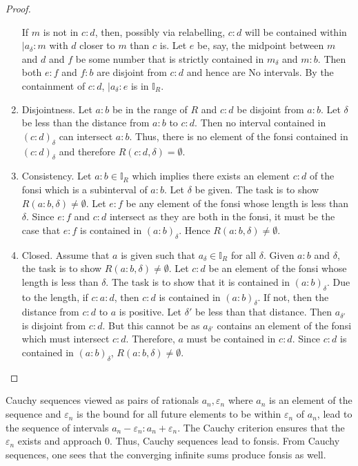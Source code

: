 \documentclass[12pt]{article}
\begin{document}
\begin{proof}
\begin{enumerate}
        If $m$ is not in $c:d$, then, possibly via relabelling, $c:d$ will be contained within $|a_\delta:m$ with $d$ closer to $m$ than $c$ is. Let $e$ be, say, the midpoint between $m$ and $d$ and $f$ be some number that is strictly contained in $m_\delta$ and $m:b$. Then both $e:f$ and $f:b$ are disjoint from $c:d$ and hence are No intervals. By the containment of $c:d$, $|a_\delta:e$ is in $\mathbb{I}_R$.
        \item Disjointness. Let $a:b$ be in the range of $R$ and $c:d$ be disjoint from $a:b$. Let $\delta$ be less than the distance from $a:b$ to $c:d$. Then no interval contained in $(c:d)_\delta$ can intersect $a:b$. Thus, there is no element of the fonsi contained in $(c:d)_\delta$ and therefore $R(c:d, \delta) = \emptyset$.
        \item Consistency. Let $a:b \in \mathbb{I}_R$ which implies there exists an element $c:d$ of the fonsi which is a subinterval of $a:b$. Let  $ \delta$ be given. The task is to show $R(a:b, \delta) \neq \emptyset$. Let $e:f$ be any element of the fonsi whose length is less than $\delta$. Since $e:f$ and $c:d$ intersect as they are both in the fonsi, it must be the case that $e:f$ is contained in $(a:b)_\delta$. Hence $R(a:b, \delta) \neq \emptyset$.
        \item Closed. Assume that $a$ is given such that $a_\delta \in \mathbb{I}_R$ for all $\delta$. Given $a:b$ and $\delta$, the task is to show $R(a:b, \delta) \neq \emptyset$. Let $c:d$ be an element of the fonsi whose length is less than $\delta$. The task is to show that it is contained in $(a:b)_\delta$. Due to the length, if $c:a:d$, then $c:d$ is contained in $(a:b)_\delta$. If not, then the distance from $c:d$ to $a$ is positive. Let $\delta'$ be less than that distance. Then $a_{\delta'}$ is disjoint from $c:d$. But this cannot be as $a_{\delta'}$ contains an element of the fonsi which must intersect $c:d$. Therefore, $a$ must be contained in $c:d$. Since $c:d$ is contained in $(a:b)_\delta$, $R(a:b, \delta) \neq \emptyset$.

    \end{enumerate}

\end{proof}

Cauchy sequences viewed as pairs of rationals $a_n, \varepsilon_n$ where $a_n$ is an element of the sequence and $\varepsilon_n$ is the bound for all future elements to be within $\varepsilon_n$ of $a_n$, lead to the sequence of intervals $a_n-\varepsilon_n:a_n+\varepsilon_n$. The Cauchy criterion ensures that the $\varepsilon_n$ exists and approach 0. Thus, Cauchy sequences lead to fonsis. From Cauchy sequences, one sees that the converging infinite sums produce fonsis as well. 
\end{document}
